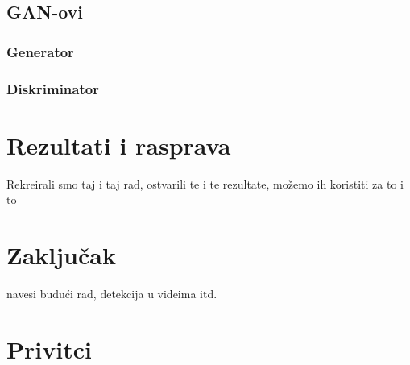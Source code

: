 \documentclass[seminarski, times, utf8]{fer}
\begin{document}
\section{GAN-ovi}
\subsection{Generator}
\subsection{Diskriminator}

\chapter{Rezultati i rasprava}
\label{pog:rezultati_i_rasprava}
Rekreirali smo taj i taj rad, ostvarili te i te rezultate, možemo ih koristiti za to i to



\chapter{Zaključak}
navesi budući rad, detekcija u videima itd.
\label{pog:zakljucak}







\chapter{Privitci}
\end{document}
